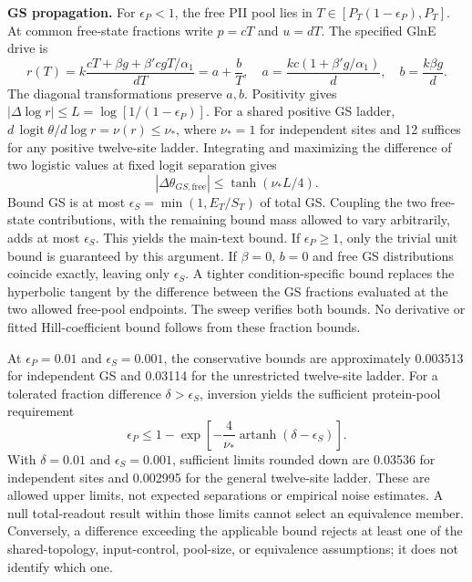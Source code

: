 \documentclass[11pt]{article}
\begin{document}
\textbf{GS propagation.} For $\epsilon_P<1$, the free PII pool lies in $T\in[P_T(1-\epsilon_P),P_T]$. At common free-state fractions write $p=cT$ and $u=dT$. The specified GlnE drive is
\[
 r(T)=k\frac{cT+\beta g+\beta'cgT/\alpha_1}{dT}
     =a+\frac{b}{T},\quad
 a=\frac{kc(1+\beta'g/\alpha_1)}d,\quad b=\frac{k\beta g}d.
\]
The diagonal transformations preserve $a,b$. Positivity gives $|\Delta\log r|\leq L=\log[1/(1-\epsilon_P)]$. For a shared positive GS ladder, $d\,\operatorname{logit}\theta/d\log r=\nu(r)\leq\nu_*$, where $\nu_*=1$ for independent sites and 12 suffices for any positive twelve-site ladder. Integrating and maximizing the difference of two logistic values at fixed logit separation gives
\[
 |\Delta\theta_{GS,\mathrm{free}}|\leq\tanh(\nu_*L/4).
\]
Bound GS is at most $\epsilon_S=\min(1,E_T/S_T)$ of total GS. Coupling the two free-state contributions, with the remaining bound mass allowed to vary arbitrarily, adds at most $\epsilon_S$. This yields the main-text bound. If $\epsilon_P\geq1$, only the trivial unit bound is guaranteed by this argument. If $\beta=0$, $b=0$ and free GS distributions coincide exactly, leaving only $\epsilon_S$. A tighter condition-specific bound replaces the hyperbolic tangent by the difference between the GS fractions evaluated at the two allowed free-pool endpoints. The sweep verifies both bounds. No derivative or fitted Hill-coefficient bound follows from these fraction bounds.

At $\epsilon_P=0.01$ and $\epsilon_S=0.001$, the conservative bounds are approximately 0.003513 for independent GS and 0.03114 for the unrestricted twelve-site ladder. For a tolerated fraction difference $\delta>\epsilon_S$, inversion yields the sufficient protein-pool requirement
\[
 \epsilon_P\leq1-\exp\left[-\frac{4}{\nu_*}\operatorname{artanh}(\delta-\epsilon_S)\right].
\]
With $\delta=0.01$ and $\epsilon_S=0.001$, sufficient limits rounded down are 0.03536 for independent sites and 0.002995 for the general twelve-site ladder. These are allowed upper limits, not expected separations or empirical noise estimates. A null total-readout result within those limits cannot select an equivalence member. Conversely, a difference exceeding the applicable bound rejects at least one of the shared-topology, input-control, pool-size, or equivalence assumptions; it does not identify which one.
\end{document}
